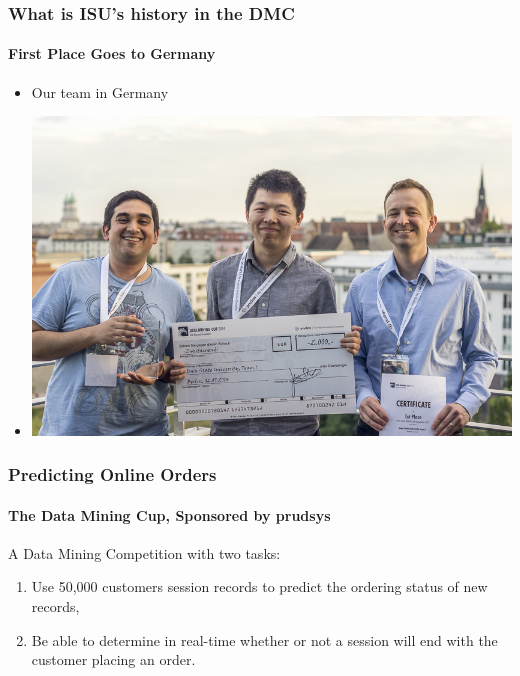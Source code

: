 \documentclass[xcolor=dvipsnames,gray,mathserif]{beamer}
\begin{document}
\begin{frame}
\frametitle{What is ISU's history in the DMC}
\framesubtitle{First Place Goes to Germany}
\begin{itemize}
\item[] Our team in Germany
\item[] \centerline{\includegraphics[width=.7\linewidth]{./figs/winners_abroad}}
\end{itemize}
\end{frame}




\begin{frame}
\frametitle{Predicting Online Orders}
\framesubtitle{The Data Mining Cup, Sponsored by prudsys}
A Data Mining Competition with two tasks:
\begin{enumerate}
   \item Use 50,000 customers session records to predict the ordering status
      of new records,
         
   \item Be able to determine in real-time whether or not a session will end
      with the customer placing an order.
\end{enumerate}
\end{frame}
\end{document}
